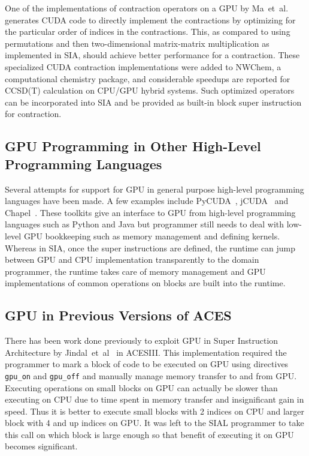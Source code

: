One of the implementations of contraction operators on a GPU by
Ma~et~al.~\cite{Ma2013} generates CUDA code to directly implement the contractions
by optimizing for the particular order of indices in the contractions. This, as
compared to using permutations and then two-dimensional matrix-matrix multiplication
as implemented in SIA, should achieve better performance for a contraction. These
specialized CUDA contraction implementations were added to NWChem, a computational
chemistry package, and considerable speedups are reported for CCSD(T) calculation
on CPU/GPU hybrid systems. Such optimized operators can be incorporated into SIA
and be provided as built-in block super instruction for contraction.

\subsection{GPU Programming in Other High-Level Programming Languages}
Several attempts for support for GPU in general purpose high-level programming
languages have been made. A few examples include PyCUDA~\cite{pycuda2011},
jCUDA~\cite{jcuda2009} and Chapel~\cite{chapelgpu}. These toolkits give an interface
to GPU from high-level programming languages such as Python and Java but
programmer still needs to deal with low-level GPU bookkeeping such as memory
management and defining kernels. Whereas in SIA, once the super instructions are
defined, the runtime can jump between GPU and CPU implementation transparently to
the domain programmer, the runtime takes care of memory management and GPU
implementations of common operations on blocks are built into the runtime.

\subsection{GPU in Previous Versions of ACES}
There has been work done previously to exploit GPU in Super Instruction
Architecture by Jindal~et~al~\cite{Jindal2016} in ACESIII. This implementation
required the programmer to mark a block of code to be executed on GPU using
directives \texttt{gpu\_on} and \texttt{gpu\_off} and manually manage memory
transfer to and from GPU. Executing operations on small blocks on GPU can
actually be slower than executing on CPU due to time spent in memory transfer and
insignificant gain in speed. Thus it is better to execute small blocks with 2
indices on CPU and larger block with 4 and up indices on GPU. It was left to the
SIAL programmer to take this call on which block is large enough so that benefit
of executing it on GPU becomes significant.

